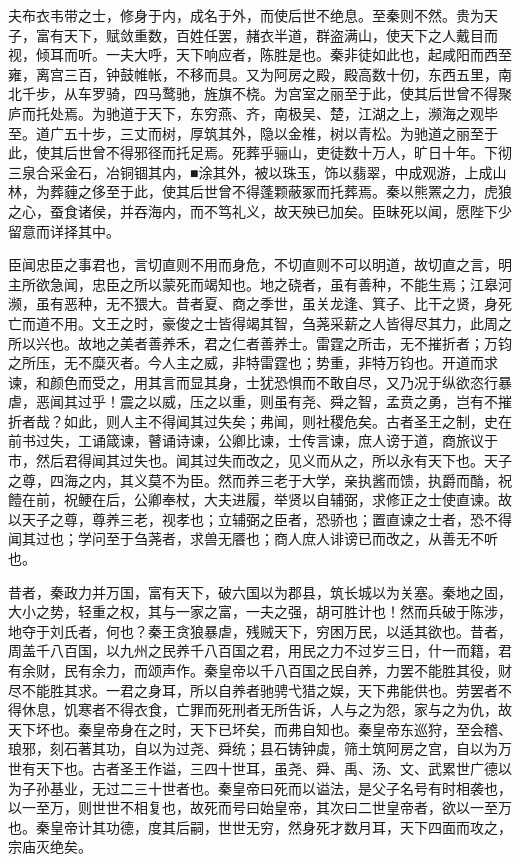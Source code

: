 \documentclass[]{article}
\begin{document}
夫布衣韦带之士，修身于内，成名于外，而使后世不绝息。至秦则不然。贵为天子，富有天下，赋敛重数，百姓任罢，赭衣半道，群盗满山，使天下之人戴目而视，倾耳而听。一夫大呼，天下响应者，陈胜是也。秦非徒如此也，起咸阳而西至雍，离宫三百，钟鼓帷帐，不移而具。又为阿房之殿，殿高数十仞，东西五里，南北千步，从车罗骑，四马鹜驰，旌旗不桡。为宫室之丽至于此，使其后世曾不得聚庐而托处焉。为驰道于天下，东穷燕、齐，南极吴、楚，江湖之上，濒海之观毕至。道广五十步，三丈而树，厚筑其外，隐以金椎，树以青松。为驰道之丽至于此，使其后世曾不得邪径而托足焉。死葬乎骊山，吏徒数十万人，旷日十年。下彻三泉合采金石，冶铜锢其内，■涂其外，被以珠玉，饰以翡翠，中成观游，上成山林，为葬薶之侈至于此，使其后世曾不得蓬颗蔽冢而托葬焉。秦以熊罴之力，虎狼之心，蚕食诸侯，并吞海内，而不笃礼义，故天殃已加矣。臣昧死以闻，愿陛下少留意而详择其中。

臣闻忠臣之事君也，言切直则不用而身危，不切直则不可以明道，故切直之言，明主所欲急闻，忠臣之所以蒙死而竭知也。地之硗者，虽有善种，不能生焉；江皋河濒，虽有恶种，无不猥大。昔者夏、商之季世，虽关龙逢、箕子、比干之贤，身死亡而道不用。文王之时，豪俊之士皆得竭其智，刍荛采薪之人皆得尽其力，此周之所以兴也。故地之美者善养禾，君之仁者善养士。雷霆之所击，无不摧折者；万钧之所压，无不糜灭者。今人主之威，非特雷霆也；势重，非特万钧也。开道而求谏，和颜色而受之，用其言而显其身，士犹恐惧而不敢自尽，又乃况于纵欲恣行暴虐，恶闻其过乎！震之以威，压之以重，则虽有尧、舜之智，孟贲之勇，岂有不摧折者哉？如此，则人主不得闻其过失矣；弗闻，则社稷危矣。古者圣王之制，史在前书过失，工诵箴谏，瞽诵诗谏，公卿比谏，士传言谏，庶人谤于道，商旅议于市，然后君得闻其过失也。闻其过失而改之，见义而从之，所以永有天下也。天子之尊，四海之内，其义莫不为臣。然而养三老于大学，亲执酱而馈，执爵而酳，祝饐在前，祝鲠在后，公卿奉杖，大夫进履，举贤以自辅弼，求修正之士使直谏。故以天子之尊，尊养三老，视孝也；立辅弼之臣者，恐骄也；置直谏之士者，恐不得闻其过也；学问至于刍荛者，求兽无餍也；商人庶人诽谤已而改之，从善无不听也。

昔者，秦政力并万国，富有天下，破六国以为郡县，筑长城以为关塞。秦地之固，大小之势，轻重之权，其与一家之富，一夫之强，胡可胜计也！然而兵破于陈涉，地夺于刘氏者，何也？秦王贪狼暴虐，残贼天下，穷困万民，以适其欲也。昔者，周盖千八百国，以九州之民养千八百国之君，用民之力不过岁三日，什一而籍，君有余财，民有余力，而颂声作。秦皇帝以千八百国之民自养，力罢不能胜其役，财尽不能胜其求。一君之身耳，所以自养者驰骋弋猎之娱，天下弗能供也。劳罢者不得休息，饥寒者不得衣食，亡罪而死刑者无所告诉，人与之为怨，家与之为仇，故天下坏也。秦皇帝身在之时，天下已坏矣，而弗自知也。秦皇帝东巡狩，至会稽、琅邪，刻石著其功，自以为过尧、舜统；县石铸钟虡，筛土筑阿房之宫，自以为万世有天下也。古者圣王作谥，三四十世耳，虽尧、舜、禹、汤、文、武累世广德以为子孙基业，无过二三十世者也。秦皇帝曰死而以谥法，是父子名号有时相袭也，以一至万，则世世不相复也，故死而号曰始皇帝，其次曰二世皇帝者，欲以一至万也。秦皇帝计其功德，度其后嗣，世世无穷，然身死才数月耳，天下四面而攻之，宗庙灭绝矣。
\end{document}
